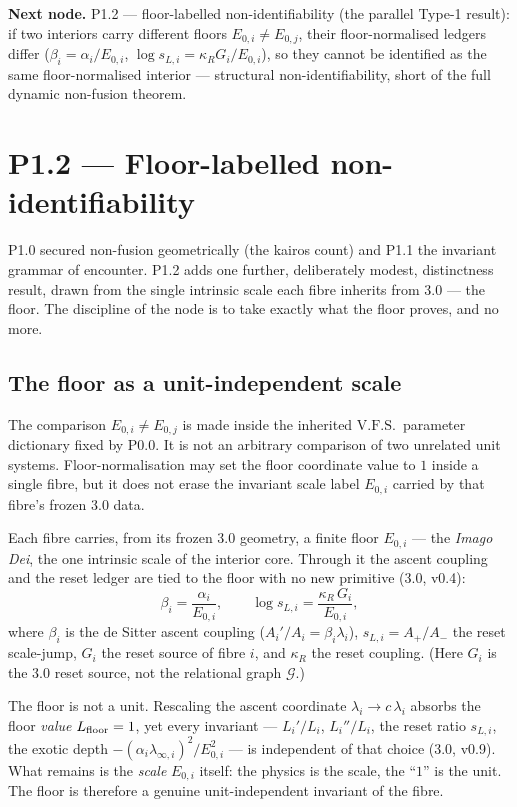 \documentclass[11pt,a4paper]{article}
\newcommand{\VFS}{\ensuremath{\mathrm{V.F.S.}}}
\theoremstyle{definition}
\theoremstyle{plain}
\theoremstyle{remark}
\begin{document}
\medskip
\textbf{Next node.} P1.2 --- floor-labelled non-identifiability (the parallel Type-1
result): if two interiors carry different floors \(E_{0,i}\neq E_{0,j}\), their
floor-normalised ledgers differ (\(\beta_i=\alpha_i/E_{0,i}\),
\(\log s_{L,i}=\kappa_R G_i/E_{0,i}\)), so they cannot be identified as the same
floor-normalised interior --- structural non-identifiability, short of the full dynamic
non-fusion theorem.

\section{P1.2 --- Floor-labelled non-identifiability}

P1.0 secured non-fusion geometrically (the kairos count) and P1.1 the invariant grammar
of encounter. P1.2 adds one further, deliberately modest, distinctness result, drawn from
the single intrinsic scale each fibre inherits from 3.0 --- the floor. The discipline of
the node is to take exactly what the floor proves, and no more.

\subsection{The floor as a unit-independent scale}

The comparison \(E_{0,i}\neq E_{0,j}\) is made inside the inherited \VFS\ parameter
dictionary fixed by P0.0. It is not an arbitrary comparison of two unrelated unit
systems. Floor-normalisation may set the floor coordinate value to \(1\) inside a
single fibre, but it does not erase the invariant scale label \(E_{0,i}\) carried
by that fibre's frozen 3.0 data.

Each fibre carries, from its frozen 3.0 geometry, a finite floor \(E_{0,i}\) --- the
\emph{Imago Dei}, the one intrinsic scale of the interior core. Through it the ascent
coupling and the reset ledger are tied to the floor with no new primitive (3.0, v0.4):
\[
\beta_i=\frac{\alpha_i}{E_{0,i}},
\qquad
\log s_{L,i}=\frac{\kappa_R\,G_i}{E_{0,i}},
\]
where \(\beta_i\) is the de Sitter ascent coupling (\(A_i'/A_i=\beta_i\lambda_i\)),
\(s_{L,i}=A_+/A_-\) the reset scale-jump, \(G_i\) the reset source of fibre \(i\), and
\(\kappa_R\) the reset coupling. (Here \(G_i\) is the 3.0 reset source, not the relational
graph \(\mathcal G\).)

The floor is not a unit. Rescaling the ascent coordinate \(\lambda_i\to c\,\lambda_i\)
absorbs the floor \emph{value} \(L_{\rm floor}=1\), yet every invariant ---
\(L_i'/L_i\), \(L_i''/L_i\), the reset ratio \(s_{L,i}\), the exotic depth
\(-(\alpha_i\lambda_{\infty,i})^2/E_{0,i}^2\) --- is independent of that choice (3.0,
v0.9). What remains is the \emph{scale} \(E_{0,i}\) itself: the physics is the scale, the
``\(1\)'' is the unit. The floor is therefore a genuine unit-independent invariant of the
fibre.
\end{document}
